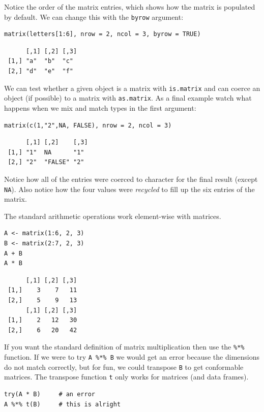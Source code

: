 \documentclass[captions=tableheading]{scrbook}
\begin{document}
\begin{example}
Notice the order of the matrix entries, which shows how the matrix is populated by default. We can change this with the \texttt{byrow} argument:


\begin{verbatim}
matrix(letters[1:6], nrow = 2, ncol = 3, byrow = TRUE)
\end{verbatim}

\begin{verbatim}
      [,1] [,2] [,3]
 [1,] "a"  "b"  "c" 
 [2,] "d"  "e"  "f"
\end{verbatim}

We can test whether a given object is a matrix with \texttt{is.matrix} and can coerce an object (if possible) to a matrix with \texttt{as.matrix}. As a final example watch what happens when we mix and match types in the first argument:


\begin{verbatim}
matrix(c(1,"2",NA, FALSE), nrow = 2, ncol = 3)
\end{verbatim}

\begin{verbatim}
      [,1] [,2]    [,3]
 [1,] "1"  NA      "1" 
 [2,] "2"  "FALSE" "2"
\end{verbatim}

Notice how all of the entries were coerced to character for the final result (except \texttt{NA}). Also notice how the four values were \emph{recycled} to fill up the six entries of the matrix.

The standard arithmetic operations work element-wise with matrices.


\begin{verbatim}
A <- matrix(1:6, 2, 3)
B <- matrix(2:7, 2, 3)
A + B
A * B
\end{verbatim}

\begin{verbatim}
      [,1] [,2] [,3]
 [1,]    3    7   11
 [2,]    5    9   13
      [,1] [,2] [,3]
 [1,]    2   12   30
 [2,]    6   20   42
\end{verbatim}

If you want the standard definition of matrix multiplication then use the \texttt{\%*\%} function. If we were to try \texttt{A \%*\% B} we would get an error because the dimensions do not match correctly, but for fun, we could transpose \texttt{B} to get conformable matrices. The transpose function \texttt{t} only works for matrices (and data frames).


\begin{verbatim}
try(A * B)     # an error
A %*% t(B)     # this is alright
\end{verbatim}


\end{example}
\end{document}
